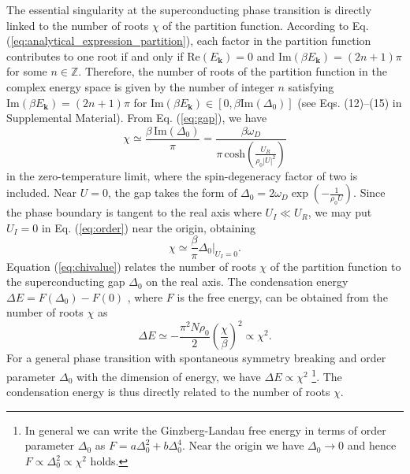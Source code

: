 \documentclass[aps,prl,twocolumn,superscriptaddress]{revtex4-1}
\begin{document}
\begin{bibunit}[apsrev4-2]
The essential singularity at the superconducting phase transition is directly linked to the number of roots $\chi$ of the partition function. According to Eq. (\ref{eq:analytical_expression_partition}), each factor in the partition function contributes to one root if and only if $\mathrm{Re}(E_{\bm{k}})=0$ and $\mathrm{Im}(\beta E_{\bm{k}})=(2n+1)\pi$ for some $n\in\mathbb{Z}$. Therefore, the number of roots of the partition function in the complex energy space is given by the number of integer $n$ satisfying $\mathrm{Im}(\beta E_{\bm{k}})=(2n+1)\pi$ for $ \mathrm{Im}(\beta E_{\bm{k}})\in [0, \beta \text{Im}(\Delta_0)]$ (see Eqs. (12)--(15) in Supplemental Material). From Eq. (\ref{eq:gap}), we have
\begin{equation}
\chi\simeq\frac{\beta\,\text{Im}(\Delta_0)}{\pi}=\frac{\beta\omega_{D}}{\pi\,\text{cosh}(\frac{U_{R}}{\rho_{0}|U|^{2}})}\label{eq:order}
\end{equation}
in the zero-temperature limit, where the spin-degeneracy factor of two is included. %
Near $U=0$, the gap takes the form of $\Delta_0=2\omega_{D}\exp(-\frac{1}{\rho_{0}U})$.
Since the phase boundary is tangent to the real axis where $U_{I}\ll U_{R}$,
we may put $U_{I}=0$ in Eq. (\ref{eq:order}) near the origin, obtaining%
\begin{equation}
\chi\simeq\frac{\beta}{\pi}\Delta_0|_{U_I=0}.\label{eq:chivalue}
\end{equation}
Equation (\ref{eq:chivalue}) relates the number of roots $\chi$ of
the partition function %
to the superconducting gap $\Delta_0$ on the real axis. The %
condensation energy $\Delta E=F(\Delta_0)-F(0)$ \cite{Coleman:2015vz}, %
where $F$ is the free energy, can be obtained from the number of roots $\chi$ %
as \cite{SupplementaryMaterial}
\begin{equation}
	\Delta E\simeq-\frac{\pi^2N\rho_0}{2}\left(\frac{\chi}{\beta}\right)^2\propto\chi^2.
\end{equation}
For a general phase transition with spontaneous symmetry breaking and order parameter $\Delta_0$ with the dimension of energy, we have $\Delta E\propto\chi^2$ \footnote{In general we can write the Ginzberg-Landau free energy in terms of order parameter $\Delta_0$ as $F=a\Delta_0^2+b\Delta_0^4$. Near the origin we have $\Delta_0\to0$ and hence $F\propto\Delta_0^2\propto\chi^2$ holds.}. The condensation energy is thus directly related to the number of roots $\chi$. 


\end{bibunit}
\end{document}
